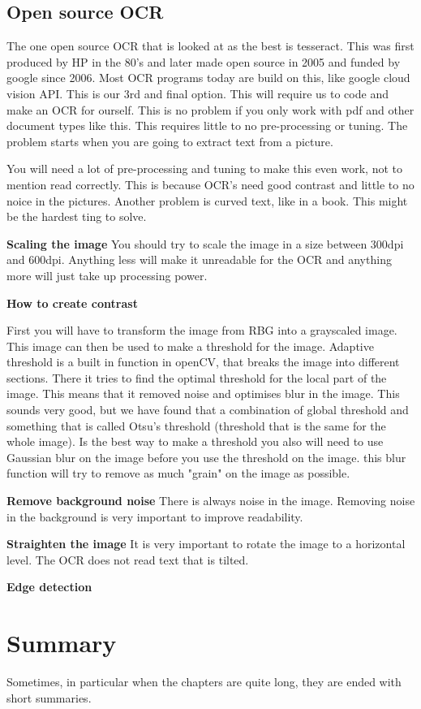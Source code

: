 \subsection{Open source OCR}\label{subsec:Open source}
The one open source OCR that is looked at as the best is tesseract.
This was first produced by HP in the 80's and later made open source in 2005 and funded by google since 2006.
Most OCR programs today are build on this, like google cloud vision API. This is our 3rd and final option.
This will require us to code and make an OCR for ourself.
This is no problem if you only work with pdf and other document types like this.
This requires little to no pre-processing or tuning.
The problem starts when you are going to extract text from a picture.

You will need a lot of pre-processing and tuning to make this even work, not to mention read correctly.
This is because OCR's need good contrast and little to no noice in the pictures.
Another problem is curved text, like in a book.
This might be the hardest ting to solve.

\textbf{Scaling the image}
You should try to scale the image in a size between 300dpi and 600dpi.
Anything less will make it unreadable for the OCR and anything more will just take up processing power.

\textbf{How to create contrast}


First you will have to transform the image from RBG into a grayscaled image.
This image can then be used to make a threshold for the image.
Adaptive threshold is a built in function in openCV, that breaks the image into different sections.
There it tries to find the optimal threshold for the local part of the image.
This means that it removed noise and optimises blur in the image.
This sounds very good, but we have found that a combination of global threshold and something that is called Otsu's threshold (threshold that is the same for the whole image).
Is the best way to make a threshold you also will need to use Gaussian blur on the image before you use the threshold on the image.
this blur function will try to remove as much "grain" on the image as possible.

\textbf{Remove background noise}
There is always noise in the image.
Removing noise in the background is very important to improve readability.

\textbf{Straighten the image}
It is very important to rotate the image to a horizontal level.
The OCR does not read text that is tilted.

\textbf{Edge detection}

\section{Summary}\label{sec:summary}

Sometimes, in particular when the chapters are quite long, they are ended with short summaries.
